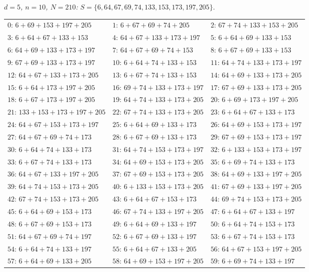 \emph{$d = 5$, $n = 10$, $N = 210$:} $S = \{6, 64, 67, 69, 74, 133, 153, 173, 197, 205\}$.
\begin{center}\scriptsize
\begin{tabular}{lll}
$0$: $6+69+153+197+205$ & $1$: $6+67+69+74+205$ & $2$: $67+74+133+153+205$\\
$3$: $6+64+67+133+153$ & $4$: $64+67+133+173+197$ & $5$: $6+64+69+133+153$\\
$6$: $64+69+133+173+197$ & $7$: $64+67+69+74+153$ & $8$: $6+67+69+133+153$\\
$9$: $67+69+133+173+197$ & $10$: $6+64+74+133+153$ & $11$: $64+74+133+173+197$\\
$12$: $64+67+133+173+205$ & $13$: $6+67+74+133+153$ & $14$: $64+69+133+173+205$\\
$15$: $6+64+173+197+205$ & $16$: $69+74+133+173+197$ & $17$: $67+69+133+173+205$\\
$18$: $6+67+173+197+205$ & $19$: $64+74+133+173+205$ & $20$: $6+69+173+197+205$\\
$21$: $133+153+173+197+205$ & $22$: $67+74+133+173+205$ & $23$: $6+64+67+133+173$\\
$24$: $64+67+153+173+197$ & $25$: $6+64+69+133+173$ & $26$: $64+69+153+173+197$\\
$27$: $64+67+69+74+173$ & $28$: $6+67+69+133+173$ & $29$: $67+69+153+173+197$\\
$30$: $6+64+74+133+173$ & $31$: $64+74+153+173+197$ & $32$: $6+133+153+173+197$\\
$33$: $6+67+74+133+173$ & $34$: $64+69+153+173+205$ & $35$: $6+69+74+133+173$\\
$36$: $64+67+133+197+205$ & $37$: $67+69+153+173+205$ & $38$: $64+69+133+197+205$\\
$39$: $64+74+153+173+205$ & $40$: $6+133+153+173+205$ & $41$: $67+69+133+197+205$\\
$42$: $67+74+153+173+205$ & $43$: $6+64+67+153+173$ & $44$: $69+74+153+173+205$\\
$45$: $6+64+69+153+173$ & $46$: $67+74+133+197+205$ & $47$: $6+64+67+133+197$\\
$48$: $6+67+69+153+173$ & $49$: $6+64+69+133+197$ & $50$: $6+64+74+153+173$\\
$51$: $64+67+69+74+197$ & $52$: $6+67+69+133+197$ & $53$: $6+67+74+153+173$\\
$54$: $6+64+74+133+197$ & $55$: $6+64+67+133+205$ & $56$: $64+67+153+197+205$\\
$57$: $6+64+69+133+205$ & $58$: $64+69+153+197+205$ & $59$: $6+69+74+133+197$\\

\end{tabular}
\end{center}
